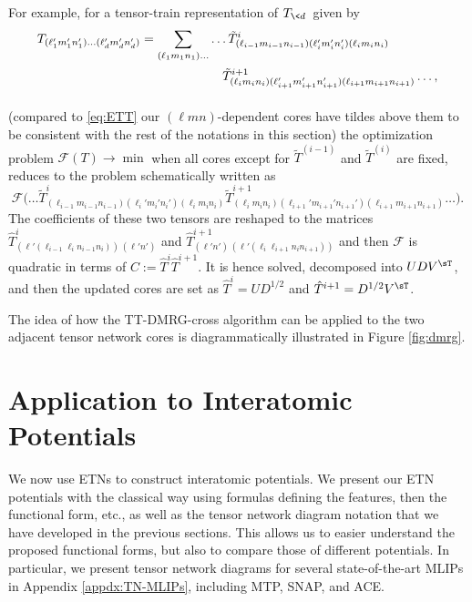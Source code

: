 For example, for a tensor-train representation of $T_{\< d\>}$ given by
\begin{align*}
T_{(\ell_1' m_1' n_1')\ldots(\ell_d' m_d' n_d')} &=
\sum_{(\ell_1 m_1 n_1)\ldots}
\ldots \tilde{T}^{i}_{(\ell_{i-1} m_{i-1} n_{i-1}) (\ell_i' m_i' n_i') (\ell_i m_i n_i)}
\\&\mathstrut\phantom{=\sum_{(\ell_1 m_1 n_1)\ldots}
\ldots}
\tilde{T}^{i+1}_{(\ell_i m_i n_i) (\ell_{i+1}' m_{i+1}' n_{i+1}') (\ell_{i+1} m_{i+1} n_{i+1})}
\ldots
,
\end{align*}
(compared to \eqref{eq:ETT} our $(\ell m n)$-dependent cores have tildes above them to be consistent with the rest of the notations in this section) the optimization problem ${\mathcal F}(T) \to \min$ when all cores except for $\tilde{T}^{(i-1)}$ and $\tilde{T}^{(i)}$ are fixed, reduces to the problem schematically written as
\[
{\mathcal F}\big(
\ldots \tilde{T}^{i}_{(\ell_{i-1} m_{i-1} n_{i-1}) (\ell_i' m_i' n_i') (\ell_i m_i n_i)}
\tilde{T}^{i+1}_{(\ell_i m_i n_i) (\ell_{i+1}' m_{i+1}' n_{i+1}') (\ell_{i+1} m_{i+1} n_{i+1})}
\ldots
\big)
.
\]
The coefficients of these two tensors are reshaped to the matrices
$\hat{T}^i_{(\ell' (\ell_{i-1} \ell_i n_{i-1} n_i))\, (\ell' n')}$ and $\hat{T}^{i+1}_{(\ell' n') \, (\ell' (\ell_i \ell_{i+1} n_i n_{i+1}))}$
and then ${\mathcal F}$ is quadratic in terms of $C := \hat{T}^i \hat{T}^{i+1}$.
It is hence solved, decomposed into $U D V^\sT$, and then the updated cores are set as $\hat{T}^i = U D^{1/2}$ and $\hat{T}^{i+1} = D^{1/2} V^\sT$.

The idea of how the TT-DMRG-cross algorithm can be applied to the two adjacent tensor network cores is diagrammatically illustrated in Figure \ref{fig:dmrg}.

\section{Application to Interatomic Potentials}
\label{sec:potentials}

We now use ETNs to construct interatomic potentials.
We present our ETN potentials with the classical way using formulas defining the features, then the functional form, etc., as well as the tensor network diagram notation that we have developed in the previous sections.
This allows us to easier understand the proposed functional forms, but also to compare those of different potentials.
In particular, we present tensor network diagrams for several state-of-the-art MLIPs in Appendix \ref{appdx:TN-MLIPs}, including MTP, SNAP, and ACE.

